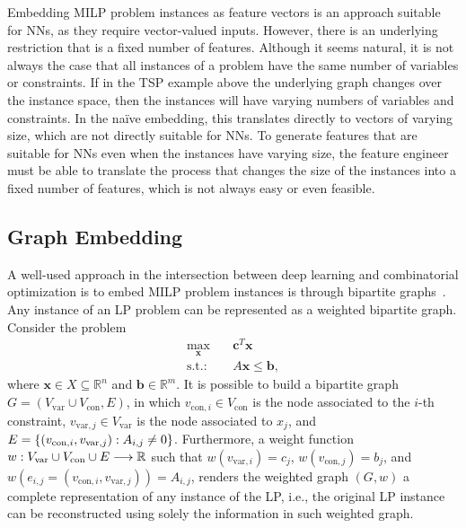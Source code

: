 Embedding MILP problem instances as feature vectors is an approach suitable for NNs, as they require vector-valued inputs.
However, there is an underlying restriction that is a fixed number of features.
Although it seems natural, it is not always the case that all instances of a problem have the same number of variables or constraints.
If in the TSP example above the underlying graph changes over the instance space, then the instances will have varying numbers of variables and constraints.
In the naïve embedding, this translates directly to vectors of varying size, which are not directly suitable for NNs.
To generate features that are suitable for NNs even when the instances have varying size, the feature engineer must be able to translate the process that changes the size of the instances into a fixed number of features, which is not always easy or even feasible.

\subsection{Graph Embedding}

A well-used approach in the intersection between deep learning and combinatorial optimization is to embed MILP problem instances is through bipartite graphs~\cite{gasseExactCombinatorialOptimization2019,nairSolvingMixedInteger2021,dingAcceleratingPrimalSolution2020,khalilMIPGNNDataDrivenFramework2022,hanGNNGuidedPredictandSearchFramework2023}.
Any instance of an LP problem can be represented as a weighted bipartite graph.
Consider the problem
\begin{equation}\label{eq:example-lp-graph}
\begin{aligned}
    \max_{\bm{x}} & \quad \bm{c}^T \bm{x} \\
    \text{s.t.:} & \quad A\bm{x} \le\bm{b} 
,\end{aligned}
\end{equation}
where $\bm{x}\in X \subseteq\mathbb{R}^n$ and $\bm{b}\in \mathbb{R}^m$.
It is possible to build a bipartite graph $G=(V_{\textrm{var}}\cup V_{\textrm{con}}, E)$, in which $v_{\textrm{con},i}\in V_{\textrm{con}}$ is the node associated to the $i$-th constraint, $v_{\textrm{var},j}\in V_{\textrm{var}}$ is the node associated to $x_j$, and $E=\{(v_{{\rm con},i},v_{{\rm var},j}) : A_{i,j} \neq 0\}$.
Furthermore, a weight function $w: V_{\textrm{var}}\cup V_\textrm{con}\cup E \longrightarrow \mathbb{R}$ such that $w(v_{\textrm{var},i}) = c_j$, $w(v_{\textrm{con},j}) = b_j$, and $w(e_{i,j}=(v_{\textrm{con},i},v_{\textrm{var},j})) = A_{i,j}$, renders the weighted graph $(G,w)$ a complete representation of any instance of the LP, i.e., the original LP instance can be reconstructed using solely the information in such weighted graph.

